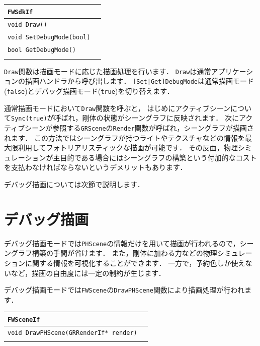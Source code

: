 \noindent
\begin{tabular}{p{.7\hsize}p{.2\hsize}}
\\
\texttt{FWSdkIf}						\\ \midrule
\texttt{void Draw()}				&	\\
\texttt{void SetDebugMode(bool)}	& 	\\
\texttt{bool GetDebugMode()}		&	\\
\\
\end{tabular}

\texttt{Draw}関数は描画モードに応じた描画処理を行います．
\texttt{Draw}は通常アプリケーションの描画ハンドラから呼び出します．
\texttt{[Set|Get]DebugMode}は通常描画モード(\texttt{false})とデバッグ描画モード(\texttt{true})を切り替えます．

\KLUDGE 通常描画モードにおいて\texttt{Draw}関数を呼ぶと，
\KLUDGE はじめにアクティブシーンについて\texttt{Sync(true)}が呼ばれ，剛体の状態がシーングラフに反映されます．
\KLUDGE 次にアクティブシーンが参照する\texttt{GRScene}の\texttt{Render}関数が呼ばれ，シーングラフが描画されます．
\KLUDGE この方法ではシーングラフが持つライトやテクスチャなどの情報を最大限利用してフォトリアリスティックな描画が可能です．
\KLUDGE その反面，物理シミュレーションが主目的である場合にはシーングラフの構築という付加的なコストを支払わなければならないというデメリットもあります．

\KLUDGE デバッグ描画については次節で説明します．

\section{デバッグ描画}

\KLUDGE デバッグ描画モードでは\texttt{PHScene}の情報だけを用いて描画が行われるので，シーングラフ構築の手間が省けます．
\KLUDGE また，剛体に加わる力などの物理シミュレーションに関する情報を可視化することができます．
\KLUDGE 一方で，予約色しか使えないなど，描画の自由度には一定の制約が生じます．

\KLUDGE デバッグ描画モードでは\texttt{FWScene}の\texttt{DrawPHScene}関数により描画処理が行われます．

\noindent
\begin{tabular}{p{.7\hsize}p{.2\hsize}}
\\
\texttt{FWSceneIf}									\\ \midrule
\texttt{void DrawPHScene(GRRenderIf* render)}	&	\\
\\
\end{tabular}

